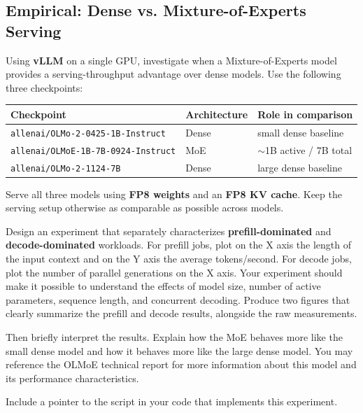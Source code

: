 \subsection{Empirical: Dense vs. Mixture-of-Experts Serving}
Using \textbf{vLLM} on a single GPU, investigate when a Mixture-of-Experts model provides a serving-throughput advantage over dense models.
Use the following three checkpoints:

\begin{center}
\begin{tabular}{lll}
\toprule
Checkpoint & Architecture & Role in comparison \\
\midrule
\texttt{allenai/OLMo-2-0425-1B-Instruct} & Dense & small dense baseline \\
\texttt{allenai/OLMoE-1B-7B-0924-Instruct} & MoE & $\sim$1B active / 7B total \\
\texttt{allenai/OLMo-2-1124-7B} & Dense & large dense baseline \\
\bottomrule
\end{tabular}
\end{center}

Serve all three models using \textbf{FP8 weights} and an \textbf{FP8 KV cache}.
Keep the serving setup otherwise as comparable as possible across models.

Design an experiment that separately characterizes \textbf{prefill-dominated} and \textbf{decode-dominated} workloads.
For prefill jobs, plot on the X axis the length of the input context and on the Y axis the average tokens/second. For decode jobs, plot the number of parallel generations on the X axis.
Your experiment should make it possible to understand the effects of model size, number of active parameters, sequence length, and concurrent decoding. Produce two figures that clearly summarize the prefill and decode results, alongside the raw measurements.

Then briefly interpret the results. Explain how the MoE behaves more like the small dense model and how it behaves more like the large dense model. You may reference the OLMoE technical report \citep{muennighoff2025olmoe} for more information about this model and its performance characteristics.

Include a pointer to the script in your code that implements this experiment.

